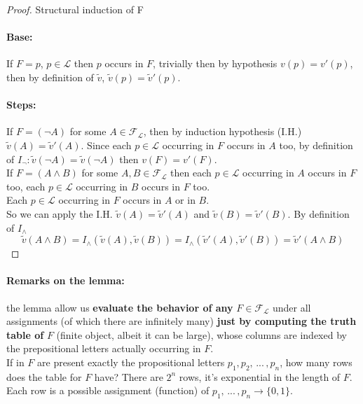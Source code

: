 \documentclass[11pt]{article}
\begin{document}
	\begin{proof}
		Structural induction of F
		\paragraph{Base:} If $F=p$, $p \in \mathcal{L}$ then $p$ occurs in $F$, trivially then by hypothesis $v(p) = v'(p)$, then by definition of $\tilde{v}$, $\tilde{v} (p) = \tilde{v}'(p)$. \\
		
		\paragraph{Steps:} If $F = (\neg A)$ for some $A \in \mathcal{F}_\mathcal{L}$, then by induction hypothesis (I.H.) $\tilde{v} (A) = \tilde{v}'(A)$. Since each $p \in \mathcal{L}$ occurring in $F$ occurs in $A$ too, by definition of $I_\neg: \tilde{v} (\neg A) = \tilde{v} (\neg A)$ then $v(F) = v'(F)$.\\
		
		If $F = (A \wedge B)$ for some $A, B \in \mathcal{F}_\mathcal{L}$ then each $p \in \mathcal{L}$ occurring in $A$ occurs in $F$ too, each $p \in \mathcal{L}$ occurring in $B$ occurs in $F$ too. \\
		
		Each $p \in \mathcal{L}$ occurring in $F$ occurs in $A$ or in $B$.\\
		So we can apply the I.H. $\tilde{v} (A) = \tilde{v}' (A)$ and $\tilde{v} (B) = \tilde{v}' (B)$. By definition of $I_\wedge$
		$$ \tilde{v} (A \wedge B) = I_\wedge (\tilde{v}(A), \tilde{v}(B)) =  I_\wedge (\tilde{v}' (A), \tilde{v}' (B)) = \tilde{v}' (A \wedge B) $$
	\end{proof}
	
	\paragraph{Remarks on the lemma:} the lemma allow us \textbf{evaluate the behavior of any} $F \in \mathcal{F}_\mathcal{L}$ under all assignments (of which there are infinitely many) \textbf{just by computing the truth table of} $F$ (finite object, albeit it can be large), whose columns are indexed by the prepositional letters actually occurring in $F$.\\
	
	If  in $F$ are present exactly the propositional letters $p_1, p_2, \, ... \, , p_n$, how many rows does the table for $F$ have? There are $2^n$ rows, it's exponential in the length of $F$. Each row is a possible assignment (function) of $p_1, \, ... \, , p_n \rightarrow \{0,1\}$.\\
	
\end{document}
